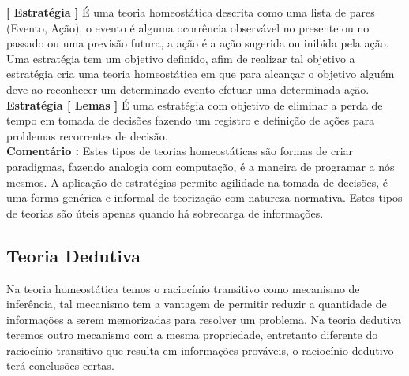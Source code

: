 \documentclass[10pt,a4paper]{report}
\begin{document}
\hspace{\baselineskip}

\textbf{[ Estratégia ]} É uma teoria homeostática descrita como uma lista de pares (Evento, Ação), o evento é alguma ocorrência observável no presente ou no passado ou uma previsão futura, a ação é a ação sugerida ou inibida pela ação. Uma estratégia tem um objetivo definido, afim de realizar tal objetivo a estratégia cria uma teoria homeostática em que para alcançar o objetivo alguém deve ao reconhecer um determinado evento efetuar uma determinada ação.\\

\textbf{Estratégia [ Lemas ]} É uma estratégia com objetivo de eliminar a perda de tempo em tomada de decisões fazendo um registro e definição de ações para problemas recorrentes de decisão.\\

\textbf{Comentário :} Estes tipos de teorias homeostáticas são formas de criar paradigmas, fazendo analogia com computação, é a maneira de programar a nós mesmos. A aplicação de estratégias permite agilidade na tomada de decisões, é uma forma genérica e informal de teorização com natureza normativa. Estes tipos de teorias são úteis apenas quando há sobrecarga de informações.



\subsection{Teoria Dedutiva}

\hspace{\baselineskip}

Na teoria homeostática temos o raciocínio transitivo como mecanismo de inferência, tal mecanismo tem a vantagem de permitir reduzir a quantidade de informações a serem memorizadas para resolver um problema. Na teoria dedutiva teremos outro mecanismo com a mesma propriedade, entretanto diferente do raciocínio transitivo que resulta em informações prováveis, o raciocínio dedutivo terá conclusões certas.\\
\end{document}
